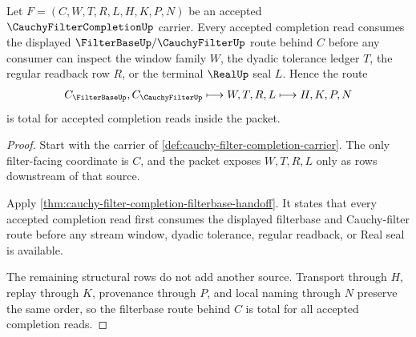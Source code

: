 \begin{theorem}
\label{thm:cauchy-filter-completion-filterbase-totality}
Let $F=(C,W,T,R,L,H,K,P,N)$ be an accepted $\CauchyFilterCompletionUp$ carrier. Every accepted completion read consumes the displayed $\FilterBaseUp/\CauchyFilterUp$ route behind $C$ before any consumer can inspect the window family $W$, the dyadic tolerance ledger $T$, the regular readback row $R$, or the terminal $\RealUp$ seal $L$. Hence the route
$$
C_{\FilterBaseUp},C_{\CauchyFilterUp} \longmapsto W,T,R,L \longmapsto H,K,P,N
$$
is total for accepted completion reads inside the packet.
\end{theorem}
\begin{proof}
Start with the carrier of \autoref{def:cauchy-filter-completion-carrier}. The only filter-facing coordinate is $C$, and the packet exposes $W,T,R,L$ only as rows downstream of that source.

Apply \autoref{thm:cauchy-filter-completion-filterbase-handoff}. It states that every accepted completion read first consumes the displayed filterbase and Cauchy-filter route before any stream window, dyadic tolerance, regular readback, or Real seal is available.

The remaining structural rows do not add another source. Transport through $H$, replay through $K$, provenance through $P$, and local naming through $N$ preserve the same order, so the filterbase route behind $C$ is total for all accepted completion reads.
\end{proof}

